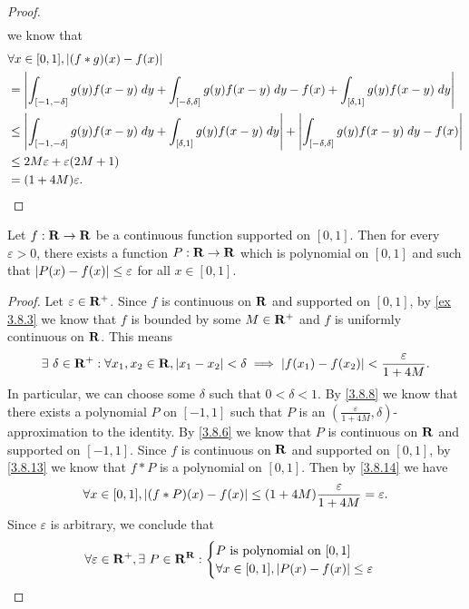 \begin{proof}
\begin{align*}
  \end{align*}
  we know that
  \begin{align*}
     & \forall x \in [0, 1], \left\lvert(f * g)(x) - f(x)\right\rvert                                                                                                            \\
     & = \left\lvert\int_{[-1, -\delta]} g(y) f(x - y) \; dy + \int_{[-\delta, \delta]} g(y) f(x - y) \; dy - f(x) + \int_{[\delta, 1]} g(y) f(x - y) \; dy\right\rvert          \\
     & \leq \left\lvert\int_{[-1, -\delta]} g(y) f(x - y) \; dy + \int_{[\delta, 1]} g(y) f(x - y) \; dy\right\rvert + \left\lvert\int_{[-\delta, \delta]} g(y) f(x - y) \; dy - f(x)\right\rvert \\
     & \leq 2 M \varepsilon + \varepsilon (2M + 1)                                                                                                              \\
     & = (1 + 4M) \varepsilon.
  \end{align*}
\end{proof}

\begin{corollary}\label{3.8.15}
  Let \(f : \mathbf{R} \to \mathbf{R}\) be a continuous function supported on \([0, 1]\).
  Then for every \(\varepsilon > 0\), there exists a function \(P : \mathbf{R} \to \mathbf{R}\) which is polynomial on \([0, 1]\) and such that \(\left\lvert P(x) - f(x)\right\rvert \leq \varepsilon\) for all \(x \in [0, 1]\).
\end{corollary}

\begin{proof}
  Let \(\varepsilon \in \mathbf{R}^+\).
  Since \(f\) is continuous on \(\mathbf{R}\) and supported on \([0, 1]\), by \cref{ex 3.8.3} we know that \(f\) is bounded by some \(M \in \mathbf{R}^+\) and \(f\) is uniformly continuous on \(\mathbf{R}\).
  This means
  \[
    \exists\ \delta \in \mathbf{R}^+ : \forall x_1, x_2 \in \mathbf{R}, \left\lvert x_1 - x_2\right\rvert < \delta \implies \left\lvert f(x_1) - f(x_2)\right\rvert < \frac{\varepsilon}{1 + 4M}.
  \]
  In particular, we can choose some \(\delta\) such that \(0 < \delta < 1\).
  By \cref{3.8.8} we know that there exists a polynomial \(P\) on \([-1, 1]\) such that \(P\) is an \((\frac{\varepsilon}{1 + 4M}, \delta)\)-approximation to the identity.
  By \cref{3.8.6} we know that \(P\) is continuous on \(\mathbf{R}\) and supported on \([-1, 1]\).
  Since \(f\) is continuous on \(\mathbf{R}\) and supported on \([0, 1]\), by \cref{3.8.13} we know that \(f * P\) is a polynomial on \([0, 1]\).
  Then by \cref{3.8.14} we have
  \[
    \forall x \in [0, 1], \left\lvert(f * P)(x) - f(x)\right\rvert \leq (1 + 4M) \frac{\varepsilon}{1 + 4M} = \varepsilon.
  \]
  Since \(\varepsilon\) is arbitrary, we conclude that
  \[
    \forall \varepsilon \in \mathbf{R}^+, \exists\ P \in \mathbf{R}^{\mathbf{R}} : \begin{cases}
      P \text{ is polynomial on } [0, 1] \\
      \forall x \in [0, 1], \left\lvert P(x) - f(x)\right\rvert \leq \varepsilon
    \end{cases}
  \]
\end{proof}


